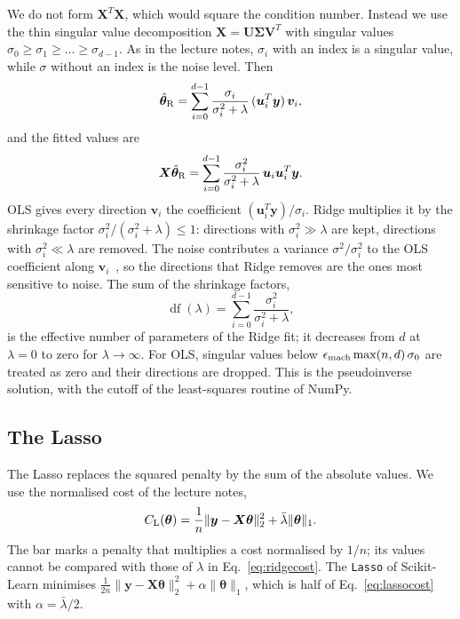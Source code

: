 \documentclass[aps,reprint,amsmath,amssymb,nofootinbib,floatfix]{revtex4-2}
\newcommand{\lb}{\bar\lambda}
\newcommand{\norm}[1]{\lVert #1\rVert}
\DeclareMathOperator{\df}{df}
\begin{document}
We do not form $\bm X^T\bm X$, which would square the condition number. Instead we use the thin
singular value decomposition $\bm X=\bm U\bm\Sigma\bm V^T$ with singular values
$\sigma_0\ge\sigma_1\ge\dots\ge\sigma_{d-1}$. As in the lecture notes, $\sigma_i$ with an index is a
singular value, while $\sigma$ without an index is the noise level. Then
\begin{equation}
  \hat{\bm\theta}_{\rm R}=\sum_{i=0}^{d-1}\frac{\sigma_i}{\sigma_i^2+\lambda}\,(\bm u_i^T\bm y)\,\bm v_i,
  \label{eq:ridgesvd}
\end{equation}
and the fitted values are
\begin{equation}
  \bm X\hat{\bm\theta}_{\rm R}=\sum_{i=0}^{d-1}\frac{\sigma_i^2}{\sigma_i^2+\lambda}\,\bm u_i\bm u_i^T\bm y.
  \label{eq:shrink}
\end{equation}
OLS gives every direction $\bm v_i$ the coefficient $(\bm u_i^T\bm y)/\sigma_i$. Ridge multiplies it
by the shrinkage factor $\sigma_i^2/(\sigma_i^2+\lambda)\le1$: directions with $\sigma_i^2\gg\lambda$
are kept, directions with $\sigma_i^2\ll\lambda$ are removed. The noise contributes a variance
$\sigma^2/\sigma_i^2$ to the OLS coefficient along $\bm v_i$~\cite{hjorthjensen2026}, so the
directions that Ridge removes are the ones most sensitive to noise. The sum of the shrinkage
factors,
\begin{equation}
  \df(\lambda)=\sum_{i=0}^{d-1}\frac{\sigma_i^2}{\sigma_i^2+\lambda},
  \label{eq:df}
\end{equation}
is the effective number of parameters of the Ridge fit; it decreases from $d$ at $\lambda=0$ to
zero for $\lambda\to\infty$. For OLS, singular values below
$\epsilon_{\rm mach}\max(n,d)\,\sigma_0$ are treated as zero and their directions are dropped. This
is the pseudoinverse solution, with the cutoff of the least-squares routine of NumPy.

\subsection{The Lasso}\label{sec:lasso}

The Lasso replaces the squared penalty by the sum of the absolute values. We use the normalised
cost of the lecture notes,
\begin{equation}
  C_{\rm L}(\bm\theta)=\frac1n\norm{\bm y-\bm X\bm\theta}_2^2+\lb\norm{\bm\theta}_1.
  \label{eq:lassocost}
\end{equation}
The bar marks a penalty that multiplies a cost normalised by $1/n$; its values cannot be compared
with those of $\lambda$ in Eq.~\eqref{eq:ridgecost}. The \texttt{Lasso} of Scikit-Learn minimises
$\frac{1}{2n}\norm{\bm y-\bm X\bm\theta}_2^2+\alpha\norm{\bm\theta}_1$, which is half of
Eq.~\eqref{eq:lassocost} with $\alpha=\lb/2$.
\end{document}
